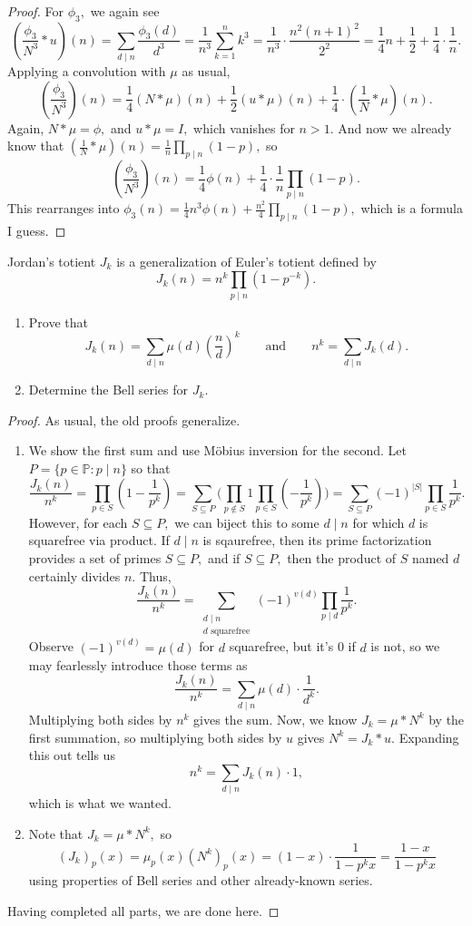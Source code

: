 \begin{proof}
For $\phi_3,$ we again see
\[\left(\frac{\phi_3}{N^3}*u\right)(n)=\sum_{d\mid n}\frac{\phi_3(d)}{d^3}=\frac1{n^3}\sum_{k=1}^nk^3=\frac1{n^3}\cdot\frac{n^2(n+1)^2}{2^2}=\frac14n+\frac12+\frac14\cdot\frac1n.\]
Applying a convolution with $\mu$ as usual,
\[\left(\frac{\phi_3}{N^3}\right)(n)=\frac14(N*\mu)(n)+\frac12(u*\mu)(n)+\frac14\cdot\left(\frac1N*\mu\right)(n).\]
Again, $N*\mu=\phi,$ and $u*\mu=I,$ which vanishes for $n>1.$ And now we already know that $\left(\frac1N*\mu\right)(n)=\frac1n\prod_{p\mid n}(1-p),$ so
\[\left(\frac{\phi_3}{N^3}\right)(n)=\frac14\phi(n)+\frac14\cdot\frac1n\prod_{p\mid n}(1-p).\]
This rearranges into $\boxed{\phi_3(n)=\frac14n^3\phi(n)+\frac{n^2}4\prod_{p\mid n}(1-p)},$ which is a formula I guess.
\end{proof}

\begin{exercise}
Jordan's totient $J_k$ is a generalization of Euler's totient defined by
\[J_k(n)=n^k\prod_{p\mid n}\left(1-p^{-k}\right).\]
\begin{enumerate}[label=(\alph*)]
    \item Prove that
    \[J_k(n)=\sum_{d\mid n}\mu(d)\left(\frac nd\right)^k\qquad\text{and}\qquad n^k=\sum_{d\mid n}J_k(d).\]
    \item Determine the Bell series for $J_k.$
\end{enumerate}
\end{exercise}

\begin{proof}
As usual, the old proofs generalize.
\begin{enumerate}[label=(\alph*)]
    \item We show the first sum and use M\"obius inversion for the second. Let $P=\{p\in\mathbb P:p\mid n\}$ so that
    \[\frac{J_k(n)}{n^k}=\prod_{p\in S}\left(1-\frac1{p^k}\right)=\sum_{S\subseteq P}\Bigg(\prod_{p\not\in S}1\prod_{p\in S}\left(-\frac1{p^k}\right)\Bigg)=\sum_{S\subseteq P}(-1)^{|S|}\prod_{p\in S}\frac1{p^k}.\]
    However, for each $S\subseteq P,$ we can biject this to some $d\mid n$ for which $d$ is squarefree via product. If $d\mid n$ is sqaurefree, then its prime factorization provides a set of primes $S\subseteq P,$ and if $S\subseteq P,$ then the product of $S$ named $d$ certainly divides $n.$ Thus,
    \[\frac{J_k(n)}{n^k}=\sum_{\substack{d\mid n\\d\text{ squarefree}}}(-1)^{v(d)}\prod_{p\mid d}\frac1{p^k}.\]
    Observe $(-1)^{v(d)}=\mu(d)$ for $d$ squarefree, but it's 0 if $d$ is not, so we may fearlessly introduce those terms as
    \[\frac{J_k(n)}{n^k}=\sum_{d\mid n}\mu(d)\cdot\frac1{d^k}.\]
    Multiplying both sides by $n^k$ gives the sum. Now, we know $J_k=\mu*N^k$ by the first summation, so multiplying both sides by $u$ gives $N^k=J_k*u.$ Expanding this out tells us
    \[n^k=\sum_{d\mid n}J_k(n)\cdot1,\]
    which is what we wanted.
    \item Note that $J_k=\mu*N^k,$ so
    \[(J_k)_p(x)=\mu_p(x)\left(N^k\right)_p(x)=(1-x)\cdot\frac1{1-p^kx}=\frac{1-x}{1-p^kx}\]
    using properties of Bell series and other already-known series.
\end{enumerate}
Having completed all parts, we are done here.
\end{proof}

